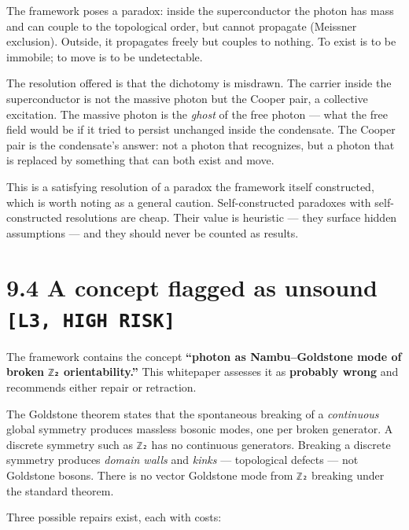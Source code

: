 \documentclass[
  11pt]{report}
\begin{document}
The framework poses a paradox: inside the superconductor the photon has
mass and can couple to the topological order, but cannot propagate
(Meissner exclusion). Outside, it propagates freely but couples to
nothing. To exist is to be immobile; to move is to be undetectable.

The resolution offered is that the dichotomy is misdrawn. The carrier
inside the superconductor is not the massive photon but the Cooper pair,
a collective excitation. The massive photon is the \emph{ghost} of the
free photon --- what the free field would be if it tried to persist
unchanged inside the condensate. The Cooper pair is the condensate's
answer: not a photon that recognizes, but a photon that is replaced by
something that can both exist and move.

This is a satisfying resolution of a paradox the framework itself
constructed, which is worth noting as a general caution.
Self-constructed paradoxes with self-constructed resolutions are cheap.
Their value is heuristic --- they surface hidden assumptions --- and
they should never be counted as results.

\hypertarget{a-concept-flagged-as-unsound-l3-high-risk}{%
\section{\texorpdfstring{9.4 A concept flagged as unsound
\texttt{{[}L3,\ HIGH\ RISK{]}}}{9.4 A concept flagged as unsound {[}L3, HIGH RISK{]}}}\label{a-concept-flagged-as-unsound-l3-high-risk}}

The framework contains the concept \textbf{``photon as Nambu--Goldstone
mode of broken \texttt{ℤ₂} orientability.''} This whitepaper assesses it
as \textbf{probably wrong} and recommends either repair or retraction.

The Goldstone theorem states that the spontaneous breaking of a
\emph{continuous} global symmetry produces massless bosonic modes, one
per broken generator. A discrete symmetry such as \texttt{ℤ₂} has no
continuous generators. Breaking a discrete symmetry produces
\emph{domain walls} and \emph{kinks} --- topological defects --- not
Goldstone bosons. There is no vector Goldstone mode from \texttt{ℤ₂}
breaking under the standard theorem.

Three possible repairs exist, each with costs:
\end{document}
